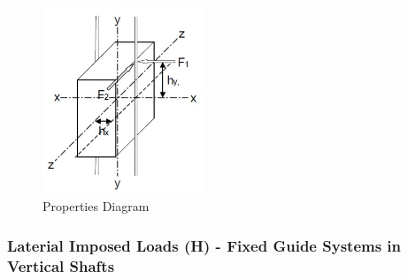 \documentclass{article}%
\begin{document}
\begin{figure}[h!]%
\includegraphics[width=180px]{Force_diagram.jpg}%
\centering%
\caption{Properties Diagram}%
\centering%
\end{figure}

%
\subsubsection{Laterial Imposed Loads (H) {-} Fixed Guide Systems in Vertical Shafts}%
\label{ssubsec:LaterialImposedLoads(H){-}FixedGuideSystemsinVerticalShafts}%
\end{document}
